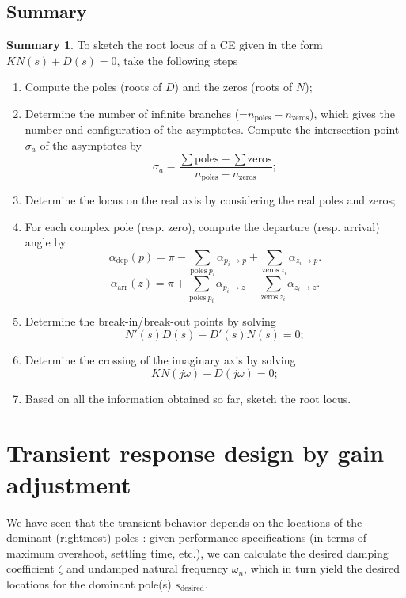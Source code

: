 \documentclass[a4paper,11pt]{report}
\theoremstyle{definition}
\newcommand{\des}{\textrm{desired}}
\newtheorem{mdsummary}{Summary}
\newenvironment{summary}%
  {\vspace{0.1cm}\begin{mdframed}[linecolor=red!60!black,
  linewidth=2pt]\begin{mdsummary}}%
  {\end{mdsummary}\end{mdframed}\vspace{0.1cm}}
\begin{document}
\subsection{Summary}

\begin{summary}
  To sketch the root locus of a CE given in the form $KN(s) + D(s) = 0$,
  take the following steps
  \begin{enumerate}
  \item Compute the poles (roots of $D$) and the zeros (roots of $N$);
  \item Determine the number of infinite branches (=$n_\textrm{poles} -
    n_\textrm{zeros}$), which gives the number and configuration of the
    asymptotes. Compute the intersection point $\sigma_a$ of the
    asymptotes by
    \[
    \sigma_a = \frac{\sum \textrm{poles}-\sum \textrm{zeros}}{n_\textrm{poles} -
    n_\textrm{zeros}};
    \]
  \item Determine the locus on the real axis by considering the real
    poles and zeros;
  \item For each complex pole (resp. zero), compute the departure
    (resp. arrival) angle by
    \[
    \alpha_\textrm{dep}(p) = \pi - \sum_{\textrm{poles}\ p_i} \alpha_{p_i \to p} +
    \sum_{\textrm{zeros}\ z_i} \alpha_{z_i \to p}.
    \]
    \[
    \alpha_\textrm{arr}(z) = \pi + \sum_{\textrm{poles}\ p_i} \alpha_{p_i \to z} -
    \sum_{\textrm{zeros}\ z_i} \alpha_{z_i \to z}.
    \]
  \item Determine the break-in/break-out points by solving
    \[
    N'(s)D(s)-D'(s)N(s)=0;
    \]
  \item Determine the crossing of the imaginary axis by solving
    \[
    KN(j\omega) + D(j\omega)=0;
    \]
  \item Based on all the information obtained so far, sketch the root
    locus.
  \end{enumerate}
\end{summary}



\section{Transient response design by gain adjustment}
\label{sec:gainadj}

We have seen that the transient behavior depends on the locations of
the dominant (rightmost) poles : given performance specifications (in
terms of maximum overshoot, settling time, etc.), we can calculate the
desired damping coefficient $\zeta$ and undamped natural frequency
$\omega_n$, which in turn yield the desired locations for the dominant
pole(s) $s_\des$.
\end{document}
